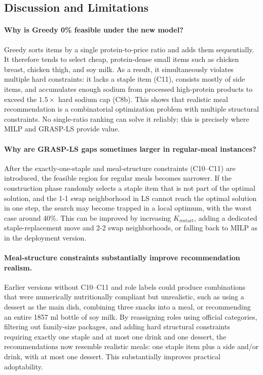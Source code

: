 \documentclass[a4paper]{article}
\begin{document}
\subsection{Discussion and Limitations}
\paragraph{Why is Greedy 0\% feasible under the new model?}Greedy sorts items by a single protein-to-price ratio and adds them sequentially. It therefore tends to select cheap, protein-dense small items such as chicken breast, chicken thigh, and soy milk. As a result, it simultaneously violates multiple hard constraints: it lacks a staple item (C11), consists mostly of side items, and accumulates enough sodium from processed high-protein products to exceed the $1.5\times$ hard sodium cap (C8b). This shows that realistic meal recommendation is a combinatorial optimization problem with multiple structural constraints. No single-ratio ranking can solve it reliably; this is precisely where MILP and GRASP-LS provide value.

\paragraph{Why are GRASP-LS gaps sometimes larger in regular-meal instances?}After the exactly-one-staple and meal-structure constraints (C10--C11) are introduced, the feasible region for regular meals becomes narrower. If the construction phase randomly selects a staple item that is not part of the optimal solution, and the 1-1 swap neighborhood in LS cannot reach the optimal solution in one step, the search may become trapped in a local optimum, with the worst case around 40\%. This can be improved by increasing $K_{\text{restart}}$, adding a dedicated staple-replacement move and 2-2 swap neighborhoods, or falling back to MILP as in the deployment version.

\paragraph{Meal-structure constraints substantially improve recommendation realism.}Earlier versions without C10--C11 and role labels could produce combinations that were numerically nutritionally compliant but unrealistic, such as using a dessert as the main dish, combining three snacks into a meal, or recommending an entire 1857 ml bottle of soy milk. By reassigning roles using official categories, filtering out family-size packages, and adding hard structural constraints requiring exactly one staple and at most one drink and one dessert, the recommendations now resemble realistic meals: one staple item plus a side and/or drink, with at most one dessert. This substantially improves practical adoptability.
\end{document}
